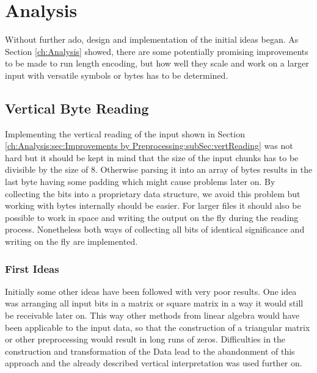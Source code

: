 
\chapter{Analysis}
\label{ch:Conceptual Design}
\par{
Without further ado, design and implementation of the initial ideas began. As Section \ref{ch:Analysis} showed, there are some potentially promising improvements to be made to run length encoding, but how well they scale and work on a larger input with versatile symbols or bytes has to be determined.
}
\section{Vertical Byte Reading}
\label{ch:Conceptual Design:sec:Parallel Byte Reading}
\par{
Implementing the vertical reading of the input shown in Section \ref{ch:Analysis:sec:Improvements by Preprocessing:subSec:vertReading} was not hard but it should be kept in mind that the size of the input chunks has to be divisible by the size of 8. Otherwise parsing it into an array of bytes results in the last byte having some padding which might cause problems later on.  By collecting the bits into a proprietary data structure, we avoid this problem but working with bytes internally should be easier. For larger files it should also be possible to work in space and writing the output on the fly during the reading process. Nonetheless both ways of collecting all bits of identical significance and writing on the fly are implemented.}

\subsection{First Ideas}
\par{
Initially some other ideas have been followed with very poor results. One idea was arranging all input bits in a matrix or square matrix in a way it would still be receivable later on. This way other methods from linear algebra would have been applicable to the input data, so that the construction of a triangular matrix or other preprocessing would result in long runs of zeros. Difficulties in the construction and transformation of the Data lead to the abandonment of this approach and the already described vertical interpretation was used further on.}


